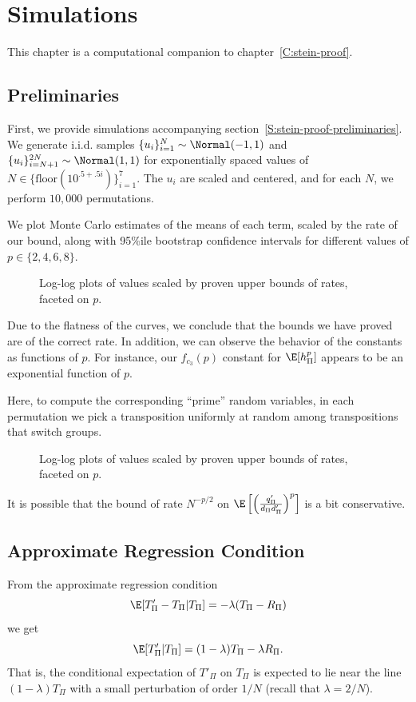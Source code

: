 \chapter{Simulations}
\label{C:simulations}
This chapter is a computational companion to chapter~\ref{C:stein-proof}.

\section{Preliminaries}
First, we provide simulations accompanying section~\ref{S:stein-proof-preliminaries}.  We generate 
i.i.d. samples $\{u_i\}_{i=1}^{N} \sim \Normal(-1, 1)$ and $\{u_i\}_{i=N+1}^{2N} \sim \Normal(1, 1)$
for exponentially spaced values of $N \in \{\text{floor}(10^{.5+.5i})\}_{i=1}^7$.  The $u_i$ are scaled
and centered, and for each $N$, we perform $10,000$ permutations.  

We plot Monte Carlo estimates of the means of each term, scaled by the rate of our bound, along with
95\%ile bootstrap confidence intervals for different values of $p \in \{2, 4, 6, 8\}$.

\begin{figure}[!ht]
  \centering
  
  \caption{Log-log plots of values scaled by proven upper bounds of rates, faceted on $p$.}
\end{figure}
Due to the flatness of the curves, we conclude that the bounds we have proved are of the correct
rate.  In addition, we can observe the behavior of the constants as functions of $p$.  For instance,
our $f_{c_3}(p)$ constant for $\E [h_{\Pi}^p]$ appears to be an exponential function of $p$.
\clearpage

Here, to compute the corresponding ``prime'' random variables, in each permutation we pick a
transposition uniformly at random among transpositions that switch groups.

\begin{figure}[!ht]
  \centering
  
  \caption{Log-log plots of values scaled by proven upper bounds of rates, faceted on $p$.}
\end{figure}
It is possible that the bound of rate $N^{-p/2}$ on 
$\E \left [ \left ( \frac{q_{\Pi}'}{d_{\Pi}d_{\Pi}'} \right )^p \right ]$ is a bit conservative.
\clearpage

\section{Approximate Regression Condition}
From the approximate regression condition
\begin{equation*}
  \E [T'_{\Pi} - T_{\Pi} | T_{\Pi}] = -\lambda (T_{\Pi} - R_{\Pi})
\end{equation*}
we get
\begin{equation*}
  \E [T'_{\Pi}| T_{\Pi}] = (1-\lambda) T_{\Pi} - \lambda R_{\Pi}.
\end{equation*}
That is, the conditional expectation of $T'_{\Pi}$ on $T_{\Pi}$ is expected to lie near the line
$(1-\lambda) T_{\Pi}$ with a small perturbation of order $1 / N$ (recall that $\lambda = 2 / N$).


